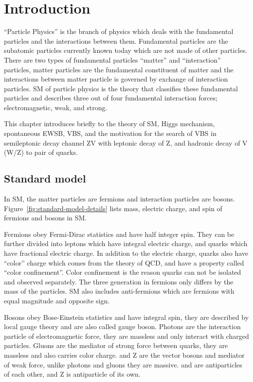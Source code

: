 \chapter{
  Introduction
 }\label{ch_intro}

``Particle Physics'' is the branch of physics which deals with the fundamental
particles and the interactions between them. Fundamental particles are the
subatomic particles currently known today which are not made of other particles.
There are two types of fundamental particles ``matter'' and ``interaction''
particles, matter particles are the fundamental constituent of matter and
the interactions between matter particle is governed by exchange of interaction particles.
\gls{SM} of particle physics is the theory that classifies these fundamental
particles and describes three out of four fundamental
interaction forces; electromagnetic, weak, and strong.

This chapter introduces briefly to the theory of \gls{SM}, Higgs mechanism,
spontaneous \gls{EWSB}, \gls{VBS}, and the motivation for the search of \gls{VBS}
in semileptonic decay channel ZV with leptonic decay of Z,
and hadronic decay of V (W/Z) to pair of quarks.

\section{
  Standard model
 }\label{ch_intro:standard-model}

In \gls{SM}, the matter particles are fermions and interaction particles are bosons.
Figure~\ref{fig:standard-model-details} lists
mass, electric charge, and spin of fermions and bosons in \gls{SM}.

Fermions obey Fermi-Dirac statistics and have half integer spin. They can be further
divided into leptons which have integral electric charge, and quarks which have
fractional electric charge. In addition to the electric charge, quarks also have
``color'' charge which comes from the theory of \gls{QCD}, and have a property called
``color confinement''. Color confinement is the reason quarks can not be isolated and
observed separately. The three generation in fermions only differs by the mass of
the particles. \gls{SM} also includes anti-fermions which are fermions with equal
magnitude and opposite sign.

Bosons obey Bose-Einstein statistics and have integral spin,
they are described by local gauge theory and are also called gauge boson.
Photons are the interaction particle of electromagnetic force, they are massless
and only interact with charged particles. Gluons are the mediator of strong force
between quarks, they are massless and also carries color charge. \Wplusminus{} and Z
are the vector bosons and mediator of weak force,
unlike photons and gluons they are massive. \Wplus{} and \Wminus{}
are antiparticles of each other, and Z is antiparticle of its own.

